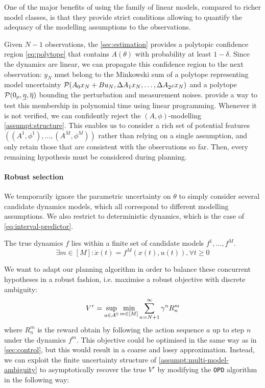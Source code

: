 \documentclass{article}
\begin{document}
One of the major benefits of using the family of linear models, compared to richer model classes, is that they provide strict conditions allowing to quantify the adequacy of the modelling assumptions to the observations.

Given $N-1$ observations, the \autoref{sec:estimation} provides a polytopic confidence region \eqref{eq:polytope} that contains $A(\theta)$ with probability at least $1-\delta$. Since the dynamics are linear, we can propagate this confidence region to the next observation: $y_{N}$ must belong to the Minkowski sum of a polytope representing model uncertainty $\mathcal{P}(A_{0} x_N + Bu_N, \Delta A_{1}x_N,\dots, \Delta A_{2^d}x_N)$ and a polytope $\mathcal{P}(0_p, \underline{\eta}, \overline{\eta})$ bounding the perturbation and measurement noises. \citet{delos2015} provide a way to test this membership in polynomial time using linear programming. Whenever it is not verified, we can confidently reject the $(A,\phi)$-modelling \autoref{assumpt:structure}. This enables us to consider a rich set of potential features $\left((A^1, \phi^1), \dots, (A^M, \phi^M)\right)$ rather than relying on a single assumption, and only retain those that are consistent with the observations so far. Then, every remaining hypothesis must be considered during planning.

\paragraph{Robust selection}

We temporarily ignore the parametric uncertainty on $\theta$ to simply consider several candidate dynamics models, which all correspond to different modelling assumptions. We also restrict to deterministic dynamics, which is the case of \eqref{eq:interval-predictor}.

\begin{assumption}
\label{assumpt:multi-model-ambiguity}
The true dynamics $f$ lies within a finite set of candidate models $f^1, \dots, f^M$.
\begin{equation*}
\exists m\in[M]: \dot{x}(t) = f^M(x(t), u(t)), \forall t\geq 0
\end{equation*}
\end{assumption}
We want to adapt our planning algorithm in order to balance these concurrent hypotheses in a robust fashion, i.e. maximise a robust objective with discrete ambiguity:
\begin{equation}
\label{eq:robust-objective-discrete}
V^r = \sup_{a\in\mathcal{A}^{\mathbb{N}}}\min_{m\in[M]} \sum_{n=N+1}^\infty \gamma^n R_n^m
\end{equation}
where $R_n^m$ is the reward obtain by following the action sequence $a$ up to step $n$ under the dynamics $f^m$.
This objective could be optimised in the same way as in \autoref{sec:control}, but this would result in a coarse and lossy approximation. Instead, we can exploit the finite uncertainty structure of \autoref{assumpt:multi-model-ambiguity} to asymptotically recover the true $V^r$ by modifying the \texttt{OPD} algorithm in the following way:
\end{document}
